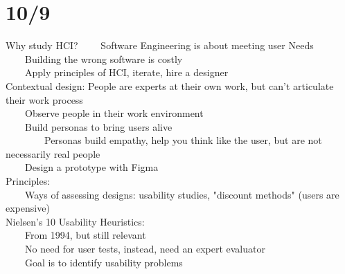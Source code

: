 \documentclass[10pt,letterpaper,unboxed,cm]{article}
\newcommand{\tab}{~~~~}
\begin{document}
\section{10/9}
Why study HCI?
\tab Software Engineering is about meeting user Needs\\
\tab Building the wrong software is costly\\
\tab Apply principles of HCI, iterate, hire a designer\\
Contextual design: People are experts at their own work, but can't articulate their work process\\
\tab Observe people in their work environment\\
\tab Build personas to bring users alive\\
\tab \tab Personas build empathy, help you think like the user, but are not necessarily real people\\
\tab Design a prototype with Figma\\
Principles: \\
\tab Ways of assessing designs: usability studies, "discount methods" (users are expensive)\\
Nielsen's 10 Usability Heuristics: \\
\tab From 1994, but still relevant\\
\tab No need for user tests, instead, need an expert evaluator\\
\tab Goal is to identify usability problems\\
\end{document}
